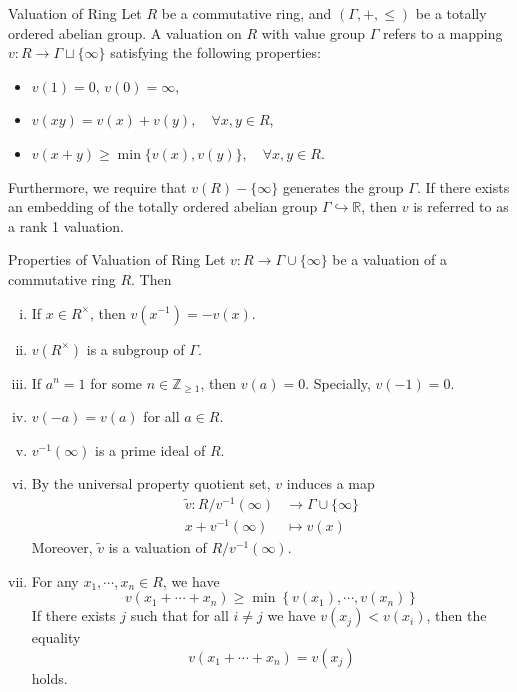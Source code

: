 \begin{definition}{Valuation of Ring}{}
    Let $R$ be a commutative ring, and $(\Gamma, +, \leq)$ be a totally ordered abelian group. A valuation on $R$ with value group $\Gamma$ refers to a mapping $v: R \rightarrow \Gamma \sqcup\{\infty\}$ satisfying the following properties:
    \begin{itemize}
        \item $v(1)=0$, $v(0)=\infty$,
        \item $v(x y)=v(x)+v(y), \quad\forall x, y \in R$,
        \item $v(x+y) \geq \min \{v(x), v(y)\}, \quad\forall x, y \in R$.        
    \end{itemize}
    Furthermore, we require that $v(R) -\{\infty\}$ generates the group $\Gamma$. If there exists an embedding of the totally ordered abelian group $\Gamma \hookrightarrow \mathbb{R}$, then $v$ is referred to as a rank 1 valuation.
\end{definition}

\begin{proposition}{Properties of Valuation of Ring}{}
    Let $v:R\to \Gamma \cup\{\infty\}$ be a valuation of a commutative ring $R$. Then
    \begin{enumerate}[(i)]
        \item If $x\in R^\times$, then $v(x^{-1})=-v(x)$.
        \item $v(R^\times)$ is a subgroup of $\Gamma$.
        \item If $a^n=1$ for some $n\in\mathbb{Z}_{\ge1}$, then $v(a)=0$. Specially, $v(-1)=0$.
        \item $v(-a)=v(a)$ for all $a\in R$.
        \item $v^{-1}\left(\infty\right)$ is a prime ideal of $R$.
        \item By the universal property quotient set, $v$ induces a map
        \begin{align*}
            \tilde{v}: R/v^{-1}\left(\infty\right)&\longrightarrow \Gamma\cup\{\infty\}\\
            x+v^{-1}\left(\infty\right)&\longmapsto v(x)
        \end{align*}
        Moreover, $\tilde{v}$ is a valuation of $R/v^{-1}\left(\infty\right)$.
        \item For any $x_1,\cdots,x_n\in R$, we have
        \[
            v\left(x_1+\cdots+x_n\right) \geq \min \left\{v\left(x_1\right), \cdots, v\left(x_n\right)\right\}
            \]
        If there exists $j$ such that for all $i\ne j$ we have $v(x_j)<v(x_i)$, then the equality 
        \[
            v\left(x_1+\cdots+x_n\right) = v(x_j)
            \]
            holds.
    \end{enumerate}
\end{proposition}

